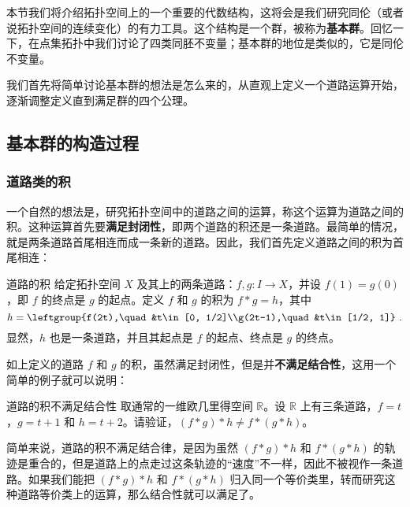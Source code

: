 
本节我们将介绍拓扑空间上的一个重要的代数结构，这将会是我们研究同伦（或者说拓扑空间的连续变化）的有力工具。这个结构是一个群，被称为\textbf{基本群}。回忆一下，在点集拓扑中我们讨论了四类同胚不变量；基本群的地位是类似的，它是同伦不变量。

我们首先将简单讨论基本群的想法是怎么来的，从直观上定义一个道路运算开始，逐渐调整定义直到满足群的四个公理。

\subsection{基本群的构造过程}
\subsubsection{道路类的积}

一个自然的想法是，研究拓扑空间中的道路之间的运算，称这个运算为道路之间的积。这种运算首先要\textbf{满足封闭性}，即两个道路的积还是一条道路。最简单的情况，就是两条道路首尾相连而成一条新的道路。因此，我们首先定义道路之间的积为首尾相连：

\begin{definition}{道路的积}\label{HomT3_def1}
给定拓扑空间 $X$ 及其上的两条道路：$f, g:I\rightarrow X$，并设 $f(1)=g(0)$，即 $f$ 的终点是 $g$ 的起点。定义 $f$ 和 $g$ 的积为 $f*g=h$，其中\begin{equation}h=\leftgroup{f(2t),\quad &t\in[0, 1/2]\\g(2t-1),\quad &t\in[1/2, 1]}~.\end{equation}
显然，$h$ 也是一条道路，并且其起点是 $f$ 的起点、终点是 $g$ 的终点。
\end{definition}

如上定义的道路 $f$ 和 $g$ 的积，虽然满足封闭性，但是并\textbf{不满足结合性}，这用一个简单的例子就可以说明：

\begin{exercise}{道路的积不满足结合性}
取通常的一维欧几里得空间 $\mathbb{R}$。设 $\mathbb{R}$ 上有三条道路，$f=t$，$g=t+1$ 和 $h=t+2$。请验证，$(f*g)*h\not=f*(g*h)$。
\end{exercise}

简单来说，道路的积不满足结合律，是因为虽然 $(f*g)*h$ 和 $f*(g*h)$ 的轨迹是重合的，但是道路上的点走过这条轨迹的“速度”不一样，因此不被视作一条道路。如果我们能把 $(f*g)*h$ 和 $f*(g*h)$ 归入同一个等价类里，转而研究这种道路等价类上的运算，那么结合性就可以满足了。


